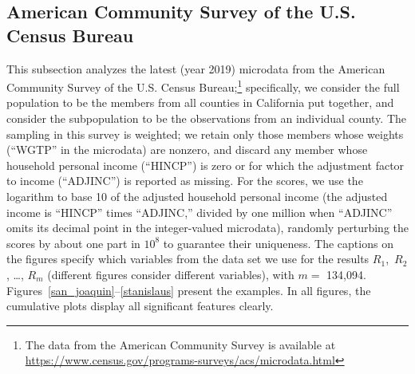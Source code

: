 \documentclass{article}
\begin{document}
\subsection{American Community Survey of the U.S. Census Bureau}
\label{census}

This subsection analyzes the latest (year 2019) microdata
from the American Community Survey of the U.S. Census Bureau;\footnote{The data
from the American Community Survey is available
at \url{https://www.census.gov/programs-surveys/acs/microdata.html}}
specifically, we consider the full population to be the members
from all counties in California put together, and consider the subpopulation
to be the observations from an individual county.
The sampling in this survey is weighted;
we retain only those members whose weights (``WGTP'' in the microdata)
are nonzero, and discard any member whose household personal income
(``HINCP'') is zero or for which the adjustment factor to income (``ADJINC'')
is reported as missing.
For the scores, we use the logarithm to base 10
of the adjusted household personal income
(the adjusted income is ``HINCP'' times ``ADJINC,'' divided by one million
when ``ADJINC'' omits its decimal point in the integer-valued microdata),
randomly perturbing the scores by about one part in $10^8$ to guarantee
their uniqueness.
The captions on the figures specify which variables from the data set
we use for the results $R_1$,~$R_2$, \dots, $R_m$
(different figures consider different variables), with $m =$ 134,094.
Figures~\ref{san_joaquin}--\ref{stanislaus} present the examples.
In all figures, the cumulative plots display all significant features clearly.
\end{document}
